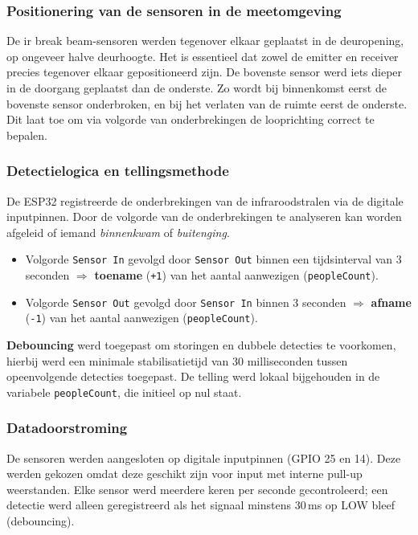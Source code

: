 \subsubsection{Positionering van de sensoren in de meetomgeving}
De \gls{ir} break beam-sensoren werden tegenover elkaar geplaatst in de deuropening, op ongeveer halve deurhoogte. Het is essentieel dat zowel de emitter en receiver precies tegenover elkaar gepositioneerd zijn. De bovenste sensor werd iets dieper in de doorgang geplaatst dan de onderste. Zo wordt bij binnenkomst eerst de bovenste sensor onderbroken, en bij het verlaten van de ruimte eerst de onderste. Dit laat toe om via volgorde van onderbrekingen de looprichting correct te bepalen. %

\subsubsection{Detectielogica en tellingsmethode}
De ESP32 registreerde de onderbrekingen van de infraroodstralen via de digitale inputpinnen. Door de volgorde van de onderbrekingen te analyseren kan worden afgeleid of iemand \textit{binnenkwam} of \textit{buitenging}.

\begin{itemize}
    \item Volgorde \texttt{Sensor In} gevolgd door \texttt{Sensor Out} binnen een tijdsinterval van 3 seconden $\Rightarrow$ \textbf{toename} (\texttt{+1}) van het aantal aanwezigen (\texttt{peopleCount}).
    \item Volgorde \texttt{Sensor Out} gevolgd door \texttt{Sensor In} binnen 3 seconden $\Rightarrow$ \textbf{afname} (\texttt{-1}) van het aantal aanwezigen (\texttt{peopleCount}).
\end{itemize}

\textbf{Debouncing} werd toegepast om storingen en dubbele detecties te voorkomen, hierbij werd een minimale stabilisatietijd van 30 milliseconden tussen opeenvolgende detecties toegepast. De telling werd lokaal bijgehouden in de variabele \texttt{peopleCount}, die initieel op nul staat.

\subsubsection{Datadoorstroming} 
De sensoren werden aangesloten op digitale inputpinnen (GPIO 25 en 14). Deze werden gekozen omdat deze geschikt zijn voor input met interne pull-up weerstanden. Elke sensor werd meerdere keren per seconde gecontroleerd; een detectie werd alleen geregistreerd als het signaal minstens 30 ms op LOW bleef (debouncing). \\

